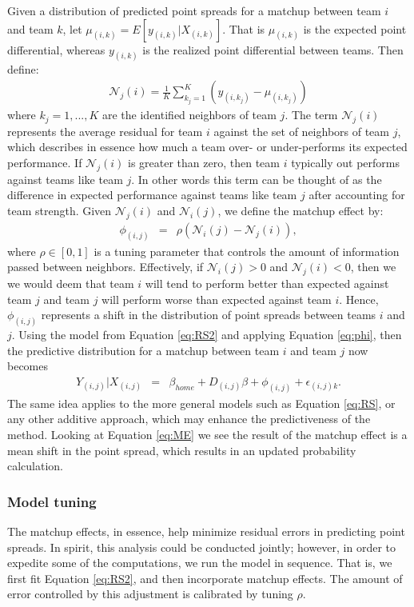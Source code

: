 \documentclass[letterpaper,12pt]{article}
\begin{document}
Given a distribution of predicted point spreads for a matchup between team $i$ and team $k$, let $\mu_{(i,k)} = E[y_{(i,k)}|X_{(i,k)}]$. That is $\mu_{(i,k)}$ is the expected point differential, whereas $y_{(i,k)}$ is the realized point differential between teams. Then define:
\begin{eqnarray*}
\mathcal{N}_j(i) = \frac{1}{K}\sum_{k_j=1}^K \left(y_{(i,k_j)} - \mu_{(i,k_j)}\right)
\end{eqnarray*}
where $k_j = 1,...,K$ are the identified neighbors of team $j$. The term $\mathcal{N}_j(i)$ represents the average residual for team $i$ against the set of neighbors of team $j$, which describes in essence how much a team over- or under-performs its expected performance. If $\mathcal{N}_j(i)$ is greater than zero, then team $i$ typically out performs against teams like team $j$. In other words this term can be thought of as the difference in expected performance against teams like team $j$ after accounting for team strength. Given $\mathcal{N}_j(i)$ and $\mathcal{N}_i(j)$, we define the matchup effect by:
\begin{eqnarray}
\phi_{(i,j)} &=& \rho(\mathcal{N}_i(j) -\mathcal{N}_j(i)),\label{eq:phi}
\end{eqnarray}
where $\rho \in [0,1]$ is a tuning parameter that controls the amount of information passed between neighbors. Effectively, if $\mathcal{N}_i(j) >0$ and $\mathcal{N}_j(i)<0$, then we we would deem that team $i$ will tend to perform better than expected against team $j$ and team $j$ will perform worse than expected against team $i$. Hence, $\phi_{(i,j)}$ represents a shift in the distribution of point spreads between teams $i$ and $j$. Using the model from Equation \ref{eq:RS2} and applying Equation \ref{eq:phi}, then the predictive distribution for a matchup between team $i$ and team $j$ now becomes
\begin{eqnarray}
Y_{(i,j)}|X_{(i,j)} &=& \beta_{home} +  D_{(i,j)}\beta + \phi_{(i,j)} +  \epsilon_{(i,j)k} \label{eq:ME}.
\end{eqnarray}
The same idea applies to the more general models such as Equation \ref{eq:RS}, or any other additive approach, which may enhance the predictiveness of the method. Looking at Equation \ref{eq:ME} we see the result of the matchup effect is a mean shift in the point spread, which results in an updated probability calculation.

\subsubsection{Model tuning\label{sec:tuning}}
The matchup effects, in essence, help minimize residual errors in predicting point spreads. In spirit, this analysis could be conducted jointly; however, in order to expedite some of the computations, we run the model in sequence. That is, we first fit Equation \ref{eq:RS2}, and then incorporate matchup effects. The amount of error controlled by this adjustment is calibrated by tuning $\rho$. 
\end{document}
